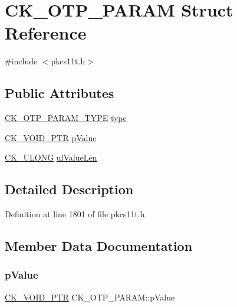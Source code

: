 \hypertarget{struct_c_k___o_t_p___p_a_r_a_m}{}\section{C\+K\+\_\+\+O\+T\+P\+\_\+\+P\+A\+R\+AM Struct Reference}
\label{struct_c_k___o_t_p___p_a_r_a_m}


{\ttfamily \#include $<$pkcs11t.\+h$>$}

\subsection*{Public Attributes}
\begin{DoxyCompactItemize}
\item 
\hyperlink{pkcs11t_8h_a62eef77156239dc17913d962b04ea14f}{C\+K\+\_\+\+O\+T\+P\+\_\+\+P\+A\+R\+A\+M\+\_\+\+T\+Y\+PE} \hyperlink{struct_c_k___o_t_p___p_a_r_a_m_a62fc02521f61dcfa046fd8118edc69dd}{type}
\item 
\hyperlink{pkcs11t_8h_ace49359127edfc5665608140005b9a96}{C\+K\+\_\+\+V\+O\+I\+D\+\_\+\+P\+TR} \hyperlink{struct_c_k___o_t_p___p_a_r_a_m_a21cb84a6ae53333db95cfbb7ba351b4f}{p\+Value}
\item 
\hyperlink{pkcs11t_8h_a35181858a3b7a0a81f49d180d8f446ef}{C\+K\+\_\+\+U\+L\+O\+NG} \hyperlink{struct_c_k___o_t_p___p_a_r_a_m_a1cb40dfa8b0f26ca3f2eabc5297e513c}{ul\+Value\+Len}
\end{DoxyCompactItemize}


\subsection{Detailed Description}


Definition at line 1801 of file pkcs11t.\+h.



\subsection{Member Data Documentation}
\mbox{\label{struct_c_k___o_t_p___p_a_r_a_m_a21cb84a6ae53333db95cfbb7ba351b4f}} 
\subsubsection{\texorpdfstring{p\+Value}{pValue}}
{\footnotesize\ttfamily \hyperlink{pkcs11t_8h_ace49359127edfc5665608140005b9a96}{C\+K\+\_\+\+V\+O\+I\+D\+\_\+\+P\+TR} C\+K\+\_\+\+O\+T\+P\+\_\+\+P\+A\+R\+A\+M\+::p\+Value}



